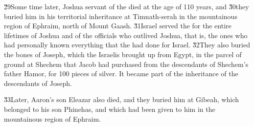 \v{29}Some time later, Joshua servant of the  died at the age of 110 years, and \v{30}they buried him in his territorial inheritance at Timnath-serah in the mountainous region of Ephraim, north of Mount Gaash. \v{31}Israel served the  for the entire lifetimes of Joshua and of the officials who outlived Joshua, that is, the ones who had personally known everything that the  had done for Israel. \v{32}They also buried the bones of Joseph, which the Israelis brought up from Egypt, in the parcel of ground at Shechem that Jacob had purchased from the descendants of Shechem's father Hamor, for 100 pieces of silver. It became part of the inheritance of the descendants of Joseph.

\v{33}Later, Aaron's son Eleazar also died, and they buried him at Gibeah, which belonged to his son Phinehas, and which had been given to him in the mountainous region of Ephraim.
